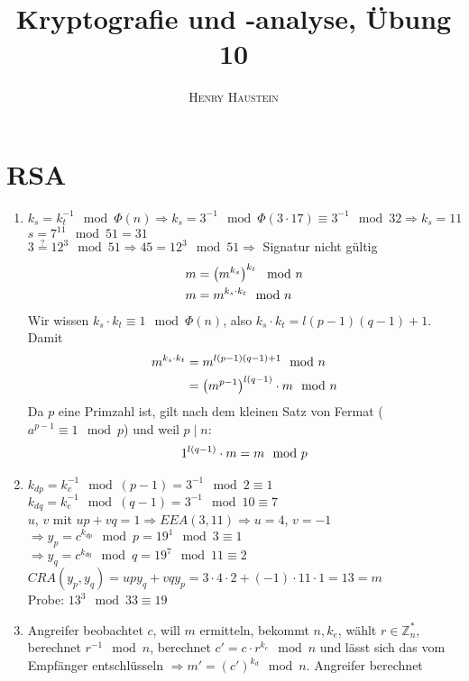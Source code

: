 \documentclass{article}
\title{\textbf{Kryptografie und -analyse, Übung 10}}
\author{\textsc{Henry Haustein}}
\date{}
\begin{document}
	\maketitle

	\section*{RSA}
	\begin{enumerate}[label=(\alph*)]
		\item $k_s = k_t^{-1}\mod\Phi(n) \Rightarrow k_s = 3^{-1}\mod \Phi(3\cdot 17) \equiv 3^{-1}\mod 32 \Rightarrow k_s = 11$ \\
		$s = 7^{11} \mod 51 = 31$ \\
		$3 \overset{?}{=} 12^3\mod 51 \Rightarrow 45 = 12^3\mod 51 \Rightarrow$ Signatur nicht gültig
		\begin{align}
			m &= \left(m^{k_s}\right)^{k_t} \mod n \notag \\
			m &= m^{k_s\cdot k_t} \mod n \notag
		\end{align}
		Wir wissen $k_s\cdot k_t \equiv 1 \mod \Phi(n)$, also $k_s\cdot k_t = l(p-1)(q-1) + 1$. Damit
		\begin{align}
			m^{k_s\cdot k_t} &= m^{l(p-1)(q-1) + 1} \mod n \notag \\
			&= \left(m^{p-1}\right)^{l(q-1)} \cdot m \mod n \notag
		\end{align}
		Da $p$ eine Primzahl ist, gilt nach dem kleinen Satz von Fermat ($a^{p-1}\equiv 1 \mod p$) und weil $p\mid n$:
		\begin{align}
			1^{l(q-1)}\cdot m = m \mod p \notag
		\end{align}
		\item $k_{dp} = k_e^{-1}\mod (p-1) = 3^{-1} \mod 2 \equiv 1$ \\
		$k_{dq} = k_e^{-1}\mod (q-1) = 3^{-1} \mod 10 \equiv 7$ \\
		$u$, $v$ mit $up+vq=1 \Rightarrow EEA(3,11) \Rightarrow u=4$, $v=-1$ \\
		$\Rightarrow y_p = c^{k_{dp}} \mod p = 19^1 \mod 3 \equiv 1$ \\
		$\Rightarrow y_q = c^{k_{dq}} \mod q = 19^7 \mod 11 \equiv 2$ \\
		$CRA(y_p, y_q) = upy_q + vqy_p = 3\cdot 4\cdot 2 + (-1)\cdot 11\cdot 1 = 13 = m$ \\
		Probe: $13^3\mod 33 \equiv 19$
		\item Angreifer beobachtet $c$, will $m$ ermitteln, bekommt $n, k_e$, wählt $r\in \mathbb{Z}_n^\ast$, berechnet $r^{-1}\mod n$, berechnet $c' = c\cdot r^{k_e}\mod n$ und lässt sich das vom Empfänger entschlüsseln $\Rightarrow m' = (c')^{k_d}\mod n$. Angreifer berechnet

\end{enumerate}
\end{document}
